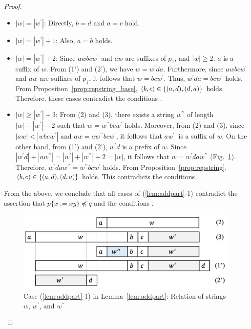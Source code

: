 \begin{proof}
  \begin{itemize}
  \item $|w|=|w^{\prime}|$: Directly, $b = d$ and $a = c$ hold.
  \item $|w|=|w^{\prime}|+1$: Also, $a = b$ holds.
  \item $|w| = |w^{\prime}|+2$: Since $awbcw^{\prime}$ and $aw$ are suffixes of $p_{1}$, and $|w|\geq 2$, $a$ is a suffix of $w$.
  From (1') and (2'), we have $w=w^{\prime}da$.
  Furthermore, since $awbcw^{\prime}$ and $aw$ are suffixes of $p_{1}$, it follows that $w=bcw^{\prime}$.
  Thus, $w^{\prime}da = bcw^{\prime}$ holds.
  From Proposition~\ref{prop:repstring_base}, $(b,c) \in \{(a,d), (d,a)\}$ holds.
  Therefore, these cases contradict the conditions \TheConditionA.
  \item $|w| \ge |w^{\prime}|+3$: From (2) and (3), there exists a string $w^{\prime\prime}$ of length $|w|-|w^{\prime}|-2$ such that $w=w^{\prime\prime}bcw^{\prime}$ holds.
  Moreover, from (2) and (3), since $|aw| < |wbcw^{\prime}|$ and $aw = aw^{\prime\prime}bcw^{\prime}$, it follows that $aw^{\prime\prime}$ is a suffix of $w$.
  On the other hand, from (1') and (2'), $w^{\prime}d$ is a prefix of $w$.
  Since $|w^{\prime}d| + |aw^{\prime\prime}| = |w^{\prime}| + |w^{\prime\prime}| + 2 = |w|$, it follows that $w=w^{\prime}daw^{\prime\prime}$ (Fig.~\ref{fig:centerproof1}).
  Therefore, $w^{\prime}daw^{\prime\prime} = w^{\prime\prime}bcw^{\prime}$ holds.
  From Proposition~\ref{prop:repstring}, $(b,c) \in \{(a,d), (d,a)\}$ holds.
  This contradicts the conditions \TheConditionA.
\end{itemize}

  From the above, we conclude that all cases of (\ref{lem:addpart}-1) contradict the assertion that $p\{x := xy\} \not\preceq q$ and the conditions \TheConditionA.
  
  \begin{figure}[t]
    \begin{center}
      \includegraphics[scale=0.345]{figs/centerproof1.pdf}
      \caption{Case (\ref{lem:addpart}-1) in Lemma~\ref{lem:addpart}: Relation of strings $w$, $w^{\prime}$, and $w^{\prime\prime}$}\label{fig:centerproof1}
    \end{center}
    \end{figure}


\end{proof}
